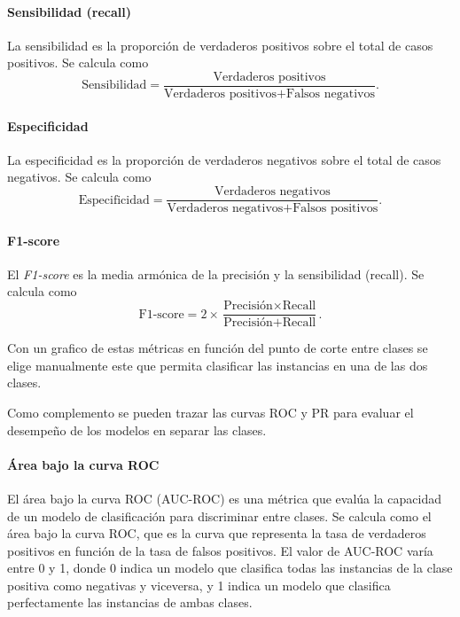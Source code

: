 \documentclass[a4paper]{report}
\begin{document}
\paragraph{Sensibilidad (recall)}
La sensibilidad es la proporción de verdaderos positivos sobre el total de casos positivos.
Se calcula como
\begin{equation}
	\text{Sensibilidad} = \frac{\text{Verdaderos positivos}}{\text{Verdaderos positivos} + \text{Falsos negativos}}.
\end{equation}

\paragraph{Especificidad}
La especificidad es la proporción de verdaderos negativos sobre el total de casos negativos.
Se calcula como
\begin{equation}
	\text{Especificidad} = \frac{\text{Verdaderos negativos}}{\text{Verdaderos negativos} + \text{Falsos positivos}}.
\end{equation}

\paragraph{F1-score}
El \emph{F1-score} es la media armónica de la precisión y la sensibilidad (recall).
Se calcula como
\begin{equation}
	\text{F1-score} = 2 \times \frac{\text{Precisión} \times \text{Recall}}{\text{Precisión} + \text{Recall}}.
\end{equation}

Con un grafico de estas métricas en función del punto de corte entre clases se elige manualmente este que permita clasificar las instancias en una de las dos clases.

Como complemento se pueden trazar las curvas ROC y PR para evaluar el desempeño de los modelos en separar las clases.

\paragraph{Área bajo la curva ROC}
El área bajo la curva ROC (AUC-ROC) es una métrica que evalúa la capacidad de un modelo de clasificación para discriminar entre clases.
Se calcula como el área bajo la curva ROC, que es la curva que representa la tasa de verdaderos positivos en función de la tasa de falsos positivos.
El valor de AUC-ROC varía entre 0 y 1, donde 0 indica un modelo que clasifica todas las instancias de la clase positiva como negativas y viceversa, y 1 indica un modelo que clasifica perfectamente las instancias de ambas clases.
\end{document}
